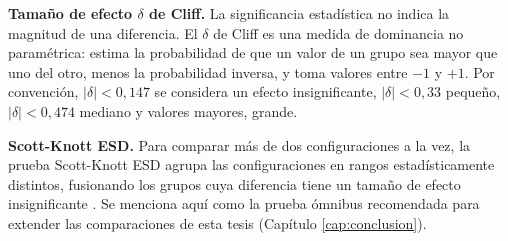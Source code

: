 \textbf{Tamaño de efecto $\delta$ de Cliff.} La significancia estadística no indica la magnitud de una diferencia. El $\delta$ de Cliff \cite{cliff1993} es una medida de dominancia no paramétrica: estima la probabilidad de que un valor de un grupo sea mayor que uno del otro, menos la probabilidad inversa, y toma valores entre $-1$ y $+1$. Por convención, $|\delta| < 0{,}147$ se considera un efecto insignificante, $|\delta| < 0{,}33$ pequeño, $|\delta| < 0{,}474$ mediano y valores mayores, grande.

\textbf{Scott-Knott ESD.} Para comparar más de dos configuraciones a la vez, la prueba Scott-Knott ESD agrupa las configuraciones en rangos estadísticamente distintos, fusionando los grupos cuya diferencia tiene un tamaño de efecto insignificante \cite{tantithamthavorn2017}. Se menciona aquí como la prueba ómnibus recomendada para extender las comparaciones de esta tesis (Capítulo \ref{cap:conclusion}).
